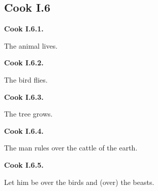 \subsection*{Cook I.6}

\par\begin{minipage}{\linewidth}\raggedright
\textbf{Cook I.6.1.}

The animal lives.

\end{minipage}\par\addvspace{4pt}

\par\begin{minipage}{\linewidth}\raggedright
\textbf{Cook I.6.2.}

The bird flies.

\end{minipage}\par\addvspace{4pt}

\par\begin{minipage}{\linewidth}\raggedright
\textbf{Cook I.6.3.}

The tree grows.

\end{minipage}\par\addvspace{4pt}

\par\begin{minipage}{\linewidth}\raggedright
\textbf{Cook I.6.4.}

The man rules over the cattle of the earth.

\end{minipage}\par\addvspace{4pt}

\par\begin{minipage}{\linewidth}\raggedright
\textbf{Cook I.6.5.}

Let him be over the birds and (over) the beasts.

\end{minipage}\par\addvspace{4pt}

